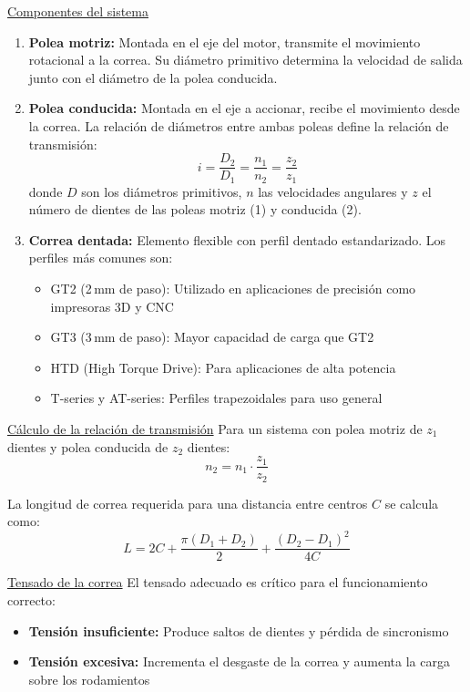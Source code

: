 \underline{Componentes del sistema}
\begin{enumerate}
    \item \textbf{Polea motriz:} Montada en el eje del motor, transmite el movimiento rotacional a la correa. Su diámetro primitivo determina la velocidad de salida junto con el diámetro de la polea conducida.

    \item \textbf{Polea conducida:} Montada en el eje a accionar, recibe el movimiento desde la correa. La relación de diámetros entre ambas poleas define la relación de transmisión:
    \begin{equation}
        i = \frac{D_2}{D_1} = \frac{n_1}{n_2} = \frac{z_2}{z_1}
    \end{equation}
    donde $D$ son los diámetros primitivos, $n$ las velocidades angulares y $z$ el número de dientes de las poleas motriz (1) y conducida (2).

    \item \textbf{Correa dentada:} Elemento flexible con perfil dentado estandarizado. Los perfiles más comunes son:
    \begin{itemize}[label=$\bullet$]
        \item GT2 (2\,mm de paso): Utilizado en aplicaciones de precisión como impresoras 3D y CNC
        \item GT3 (3\,mm de paso): Mayor capacidad de carga que GT2
        \item HTD (High Torque Drive): Para aplicaciones de alta potencia
        \item T-series y AT-series: Perfiles trapezoidales para uso general
    \end{itemize}
\end{enumerate}

\underline{Cálculo de la relación de transmisión}
Para un sistema con polea motriz de $z_1$ dientes y polea conducida de $z_2$ dientes:
\begin{equation}
    n_2 = n_1 \cdot \frac{z_1}{z_2}
\end{equation}

La longitud de correa requerida para una distancia entre centros $C$ se calcula como:
\begin{equation}
    L = 2C + \frac{\pi(D_1 + D_2)}{2} + \frac{(D_2 - D_1)^2}{4C}
\end{equation}

\underline{Tensado de la correa}
El tensado adecuado es crítico para el funcionamiento correcto:
\begin{itemize}[label=$\bullet$]
    \item \textbf{Tensión insuficiente:} Produce saltos de dientes y pérdida de sincronismo
    \item \textbf{Tensión excesiva:} Incrementa el desgaste de la correa y aumenta la carga sobre los rodamientos
\end{itemize}

